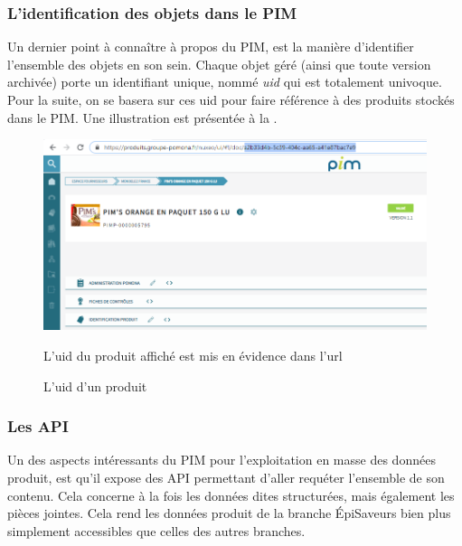                 \subsubsection{L'identification des objets dans le PIM}

                Un dernier point à connaître à propos du PIM, est la manière d'identifier l'ensemble des objets en son sein.
                Chaque objet géré (ainsi que toute version archivée) porte un identifiant unique, nommé \emph{uid} qui est totalement univoque.
                Pour la suite, on se basera sur ces uid pour faire référence à des produits stockés dans le PIM.
                Une illustration est présentée à la .

                \begin{figure}[htpb]
                    \begin{center}
                    \includegraphics[width=\linewidth]{img/uid.png}
                    \end{center}
                    L'uid du produit affiché est mis en évidence dans l'url
                    \caption{L'uid d'un produit}
                    \label{fig:uid}
                \end{figure}                 

                \subsubsection{Les API}

                Un des aspects intéressants du PIM pour l'exploitation en masse des données produit, est qu'il expose des API permettant d'aller requéter l'ensemble de son contenu.
                Cela concerne à la fois les données dites structurées, mais également les pièces jointes.
                Cela rend les données produit de la branche \'{E}piSaveurs bien plus simplement accessibles que celles des autres branches.